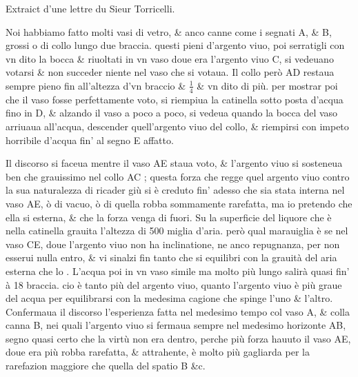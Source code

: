 \documentclass[11pt,a4paper]{article}
\begin{document}
Extraict d'une lettre du Sieur Torricelli.


Noi habbiamo fatto molti vasi di vetro, \& anco canne come i segnati A, \& B, grossi o di collo lungo due braccia. questi pieni d'argento viuo, poi serratigli con vn dito la bocca \struck{\ill{}} \& riuoltati in vn vaso doue era l'argento viuo C, si vedeuano votarsi \& non succeder niente nel vaso che si votaua. Il collo però AD restaua sempre pieno fin all'altezza d'vn braccio \& $\frac{1}{4}$ \& vn dito di più. per mostrar poi che il vaso fosse perfettamente voto, si riempiua la catinella sotto posta d'acqua fino in D, \& alzando il vaso a poco a poco, si vedeua quando la bocca del vaso arriuaua all'acqua, descender quell'argento viuo del collo, \& riempirsi con impeto horribile d'acqua fin' al segno E affatto.

Il discorso si faceua mentre il vaso AE staua voto, \& l'argento viuo si sosteneua ben che grauissimo nel collo AC ; questa forza che regge quel argento viuo contro la sua naturalezza di ricader giù si è creduto fin' adesso che sia stata interna nel vaso AE, ò di vacuo, ò di quella robba sommamente rarefatta, ma io pretendo che ella si esterna, \& che la forza venga di fuori. Su la superficie del liquore che è nella catinella grauita l'altezza di 500 miglia d'aria. però qual marauiglia è se nel vaso CE, doue l'argento viuo non ha inclinatione, ne anco repugnanza, per non esserui nulla entro, \& vi sinalzi fin tanto che si equilibri con la grauità del aria esterna che lo . L'acqua poi in vn vaso simile ma molto più lungo salirà quasi fin' à 18 braccia. cio è tanto più del argento viuo, quanto l'argento viuo è più graue del acqua per equilibrarsi con la medesima cagione che spinge l'uno \& l'altro. Confermaua il discorso l'esperienza fatta nel medesimo tempo col vaso A, \& colla canna B, nei quali l'argento viuo si fermaua sempre nel medesimo horizonte AB, segno quasi certo che la virtù non era dentro, perche più forza  hauuto il vaso AE, doue era più robba rarefatta, \& attrahente, è molto più gagliarda per la rarefazion maggiore che quella del  spatio B \&c.
\end{document}
